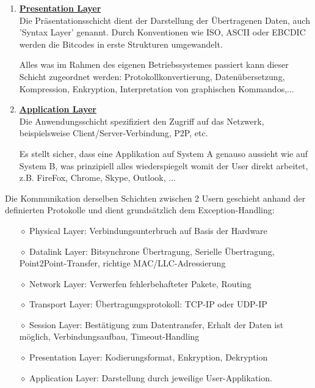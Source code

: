 \documentclass[11pt]{article}
\begin{document}
\begin{enumerate}
        \emph{Protokolle}:
        \begin{addmargin}[1em]{1em}
            - ISO 8326 - OSI protocol suite: Neuverbindungsaufbau nach Störungen
            - ZIP - Zone Information Protocol (AppleTalk)
            - SMB - Server Message Block
            - RPC - Remote Procedure Call
        \end{addmargin}

        Wenn man beispielsweise eine Website aufruft, so startet der Layer eine 'Session' mit dem jeweiligen Webserver.

        \item \textbf{\underline{Presentation Layer}}\\
        Die Präsentationsschicht dient der Darstellung der Übertragenen Daten, auch 'Syntax Layer' genannt.
        Durch Konventionen wie ISO, ASCII oder EBCDIC werden die Bitcodes in erste Strukturen umgewandelt.

        Alles was im Rahmen des eigenen Betriebssystemes passiert kann dieser Schicht zugeordnet werden: Protokollkonvertierung,
        Datenübersetzung, Kompression, Enkryption, Interpretation von graphischen Kommandos,...

        \item \textbf{\underline{Application Layer}}\\
        Die Anwendungsschicht spezifiziert den Zugriff auf das Netzwerk, beispielsweise Client/Server-Verbindung, P2P, etc.

        Es stellt sicher, dass eine Applikation auf System A genauso aussieht wie auf System B, was
        prinzipiell alles wiederspiegelt womit der User direkt arbeitet, z.B. FireFox, Chrome, Skype, Outlook, ...\\

    \end{enumerate}

    Die Kommunikation derselben Schichten zwischen 2 Usern geschieht anhand der definierten Protokolle und dient grundsätzlich dem Exception-Handling:
\begin{itemize}
    \item[$\diamond$] Physical Layer: Verbindungsunterbruch auf Basis der Hardware
    \item[$\diamond$] Datalink Layer: Bitsynchrone Übertragung, Serielle Übertragung, Point2Point-Transfer, richtige MAC/LLC-Adressierung
    \item[$\diamond$] Network Layer: Verwerfen fehlerbehafteter Pakete, Routing
    \item[$\diamond$] Transport Layer: Übertragungsprotokoll: TCP-IP oder UDP-IP
    \item[$\diamond$] Session Layer: Bestätigung zum Datentransfer, Erhalt der Daten ist möglich, Verbindungsaufbau, Timeout-Handling
    \item[$\diamond$] Presentation Layer: Kodierungsformat, Enkryption, Dekryption
    \item[$\diamond$] Application Layer: Darstellung durch jeweilige User-Applikation.
\end{itemize}
\end{document}
